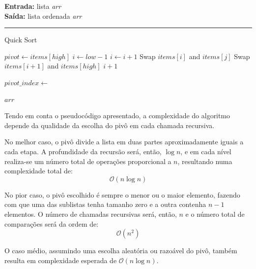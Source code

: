 \documentclass[conference]{IEEEtran}
\begin{document}
\begin{algorithm}[H]
    \raggedright
    \vspace{.1em}
    \textbf{Entrada:} lista \textit{arr} \\
    \textbf{Saída:} lista ordenada \textit{arr} \\
    \vspace{.5em}
    \hrule 
    \caption{Quick Sort}
    \begin{algorithmic}[1]
            \State $pivot \gets items[high]$
            \State $i \gets low - 1$
                    \State $i \gets i + 1$
                    \State Swap $items[i]$ and $items[j]$
                \EndIf
            \EndFor
            \State Swap $items[i + 1]$ and $items[high]$
            \State \Return $i + 1$
        \EndFunction
    
                \State $pivot\_index \gets$ 
                \State {}
                \State {}
            \EndIf
        \EndFunction
    
        \State {}
        \State \Return $arr$
    \end{algorithmic}
\end{algorithm}

Tendo em conta o pseudocódigo apresentado, a complexidade do algoritmo depende da qualidade da escolha do pivô em cada chamada recursiva.

No melhor caso, o pivô divide a lista em duas partes aproximadamente iguais a cada etapa. A profundidade da recursão será, então, \(\log n\), e em cada nível realiza-se um número total de operações proporcional a \(n\), resultando numa complexidade total de:
\[
\mathcal{O}(n \log n)
\]

No pior caso, o pivô escolhido é sempre o menor ou o maior elemento, fazendo com que uma das sublistas tenha tamanho zero e a outra contenha \(n - 1\) elementos. O número de chamadas recursivas será, então, \(n\) e o número total de comparações será da ordem de:
\[
\mathcal{O}(n^2)
\]

O caso médio, assumindo uma escolha aleatória ou razoável do pivô, também resulta em complexidade esperada de \(\mathcal{O}(n \log n)\).
\end{document}
